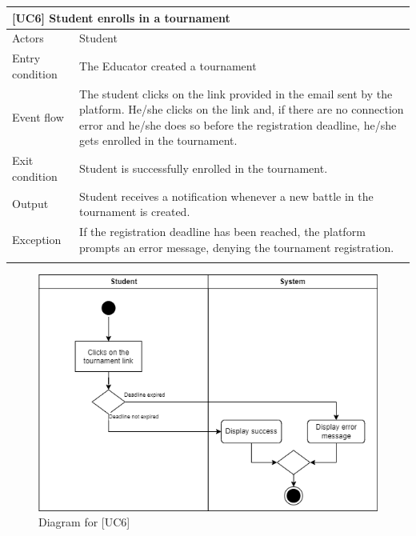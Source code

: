 \documentclass[12pt,oneside,a4paper]{article}
\begin{document}
\clearpage

\begin{table}[htbp]
\begin{tabular}{|l|p{12cm}|}
    \hline
    \multicolumn{2}{|l|}{\textbf{[UC6] Student enrolls in a tournament}}\\
    \hline
    Actors & Student\\
    \hline
    Entry condition & The Educator created a tournament\\
    \hline
    Event flow & The student clicks on the link provided in the email sent by the platform. He/she clicks on the link and, if there are no connection error and he/she does so before the registration deadline, he/she gets enrolled in the tournament.\\
    \hline
    Exit condition & Student is successfully enrolled in the tournament.\\
    \hline
    Output & Student receives a notification whenever a new battle in the tournament is created.\\
    \hline
    Exception & If the registration deadline has been reached, the platform prompts an error message, denying the tournament registration.\\
    \lasthline
\end{tabular}
\end{table}

\begin{figure}
    \centering
    \includegraphics[width=1\linewidth]{Images//Diagrams/StudentsEnrollsTournament.png}
    \caption{Diagram for [UC6]}
    \label{fig:enter-label}
\end{figure}
\end{document}
